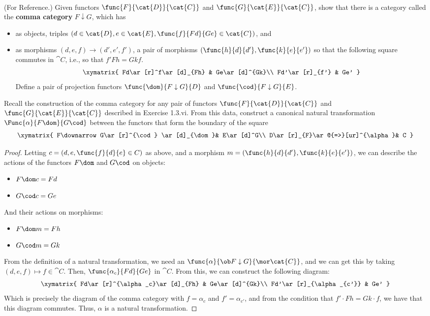 \documentclass[main.tex]{subfiles}
\begin{document}
\paragraph{}
\begin{exercise}(For Reference.)
	Given functors $\func{F}{\cat{D}}{\cat{C}}$ and
	$\func{G}{\cat{E}}{\cat{C}}$, show that there is a category called the
	\textbf{comma category} $F\downarrow G$, which has\\
	\begin{itemize}
		\item as objects, triples $(d\in\cat{D}, e\in\cat{E},
			\func{f}{Fd}{Ge}\in\cat{C})$, and

		\item as morphisms $(d,e,f)\rightarrow(d',e',f')$, a pair of morphisms
			$(\func{h}{d}{d'},\func{k}{e}{e'})$ so that the following square
			commutes in $\cat{C}$, i.e., so that $f' Fh = Gk f$.
			\[\xymatrix{ Fd\ar[r]^f\ar[d]_{Fh} & Ge\ar[d]^{Gk}\\
					Fd'\ar[r]_{f'} & Ge' }\]
			Define a pair of projection functors $\func{\dom}{F\downarrow G}{D}$
			and $\func{\cod}{F\downarrow G}{E}$.
	\end{itemize}
\end{exercise}
\begin{exercise}
	Recall the construction of the comma category for any pair of functors
	$\func{F}{\cat{D}}{\cat{C}}$ and $\func{G}{\cat{E}}{\cat{C}}$ described in
	Exercise 1.3.vi. From this data, construct a canonical natural
	transformation $\Func{\alpha}{F\dom}{G\cod}$ between the functors that form
	the boundary of the square
	\[\xymatrix{
			F\downarrow G\ar[r]^{\cod} \ar[d]_{\dom}& E\ar[d]^G\\
			D\ar[r]_{F}\ar@{=>}[ur]^{\alpha}& C
		}\]
\end{exercise}

\begin{proof}	
	Letting $c=(d,e,\func{f}{d}{e}\in C)$ as above, and a morphism
	$m=(\func{h}{d}{d'},\func{k}{e}{e'})$, we can describe the actions of the
	functors $F\dom$ and $G\cod$ on objects:
	\begin{itemize}
		\item $F\dom c = Fd$
		\item $G\cod c = Ge$
	\end{itemize}
	And their actions on morphisms:
	\begin{itemize}
		\item $F\dom m = Fh$
		\item $G\cod m = Gk$
	\end{itemize}
	From the definition of a natural transformation, we need an
	$\func{\alpha}{\ob F\downarrow G}{\mor\cat{C}}$, and we can get this by
	taking $(d,e,f)\mapsto f\in \cat{C}$. Then, $\func{\alpha_c}{Fd}{Ge}$ in
	$\cat{C}$. From this, we can construct the following diagram:
	\[\xymatrix{
		Fd\ar[r]^{\alpha_c}\ar[d]_{Fh} & Ge\ar[d]^{Gk}\\
		Fd'\ar[r]_{\alpha_{c'}} & Ge'
	}\]
	Which is precisely the diagram of the comma category with $f=\alpha_c$ and
	$f'=\alpha_{c'}$, and from the condition that $f'\cdot Fh = Gk\cdot f$, we
	have that this diagram commutes. Thus, $\alpha$ is a natural
	transformation.
\end{proof}
\end{document}
